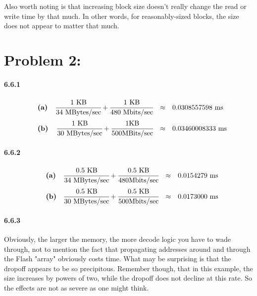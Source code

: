 \documentclass[a4paper]{article}
\begin{document}
Also worth noting is that increasing block size doesn't really change the read or write time by that much. In other words, for reasonably-sized blocks, the size does not appear to matter that much.

\section*{Problem 2:}

\paragraph{6.6.1} 

\begin{equation}
\begin{array}{llrll}
& \textbf{(a)} & \cfrac{1 \mbox{ KB}}{34 \mbox{ MBytes/sec}} + \cfrac{1 \mbox{ KB}}{480 \mbox{ Mbits/sec}} & \approx & 0.0308557598 \mbox{ ms} \\[.15in]
& \textbf{(b)} & \cfrac{1 \mbox{ KB}}{30 \mbox{ MBytes/sec}} + \cfrac{1 \mbox{KB}}{500 \mbox{MBits/sec}} & \approx & 0.03460008333 \mbox{ ms}
\end{array}
\end{equation}

\paragraph{6.6.2}

\begin{equation}
\begin{array}{llrll}
& \textbf{(a)} & \cfrac{0.5 \mbox{ KB}}{34 \mbox{ MBytes/sec}} + \cfrac{0.5 \mbox{ KB}}{480 \mbox{Mbits/sec}} & \approx & 0.0154279 \mbox{ ms} \\[.15in]
& \textbf{(b)} & \cfrac{0.5 \mbox{ KB}}{30 \mbox{ MBytes/sec}} + \cfrac{0.5 \mbox{ KB}}{500 \mbox{Mbits/sec}} & \approx & 0.0173000 \mbox{ ms}
\end{array}
\end{equation}

\paragraph{6.6.3} Obviously, the larger the memory, the more decode logic you have to wade through, not to mention the fact that propagating addresses around and through the Flash "array" obviously costs time. What may be surprising is that the dropoff appears to be so precipitous. Remember though, that in this example, the size increases by powers of two, while the dropoff does not decline at this rate. So the effects are not as severe as one might think.
\end{document}
